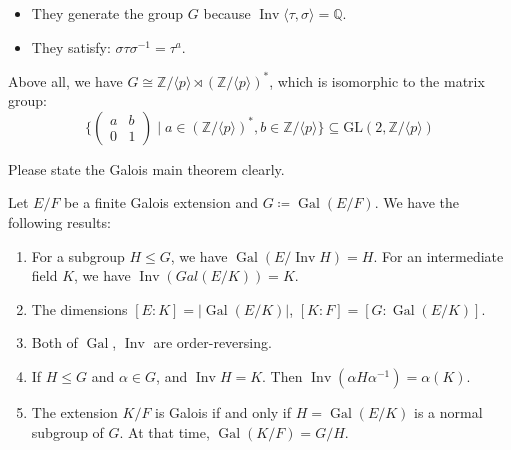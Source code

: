 \begin{solution}
\begin{itemize}
        \item They generate the group $G$ because $\operatorname{Inv}\langle \tau, \sigma \rangle=\mathbb{Q}$. 
        \item They satisfy: $\sigma\tau\sigma^{-1}=\tau^{a}$.
    \end{itemize}
    Above all, we have $G\cong\mathbb{Z}/\langle p \rangle \rtimes (\mathbb{Z}/\langle p\rangle)^\ast$, which is isomorphic to the matrix group: 
        \[
            \Biggl\{ 
            \begin{pmatrix} 
            a & b \\ 
            0 & 1 
            \end{pmatrix} 
            \mid 
            a \in (\mathbb{Z}/\langle p \rangle)^{\ast}, 
            b \in \mathbb{Z}/\langle p \rangle 
            \Biggr\} 
            \subseteq \mathrm{GL}(2, \mathbb{Z}/\langle p \rangle)
        \]
\end{solution}

\setcounter{pb}{27}
\begin{problem}
    Please state the Galois main theorem clearly.
\end{problem}

\begin{solution}
    Let $E/F$ be a finite Galois extension and $G \coloneqq \operatorname{Gal}(E/F)$. We have the following results:
    \begin{enumerate}
        \item For a subgroup $H\leq G$, we have $\operatorname{Gal}(E/\operatorname{Inv}H)=H$. For an intermediate field $K$, we have $\operatorname{Inv}(Gal(E/K))=K$. 
        \item The dimensions $[E:K]=|\operatorname{Gal}(E/K)|$, $[K:F]=[G:\operatorname{Gal}(E/K)]$.
        \item Both of $\operatorname{Gal}$, $\operatorname{Inv}$ are order-reversing. 
        \item If $H\leq G$ and $\alpha\in G$, and $\operatorname{Inv}H=K$. Then $\operatorname{Inv}(\alpha H \alpha^{-1})=\alpha(K)$. 
        \item The extension $K/F$ is Galois if and only if $H=\operatorname{Gal}(E/K)$ is a normal subgroup of  $G$. At that time, $\operatorname{Gal}(K/F)=G/H$.
    \end{enumerate}
\end{solution}